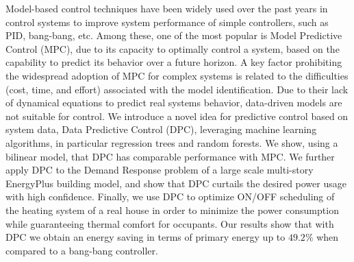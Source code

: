 Model-based control techniques have been widely used over the past years in control systems to improve system performance of simple controllers, such as PID, bang-bang, etc. Among these, one of the most popular is Model Predictive Control (MPC), due to its capacity to optimally control a system, based on the capability to predict its behavior over a future horizon. A key factor prohibiting the widespread adoption of MPC for complex systems is related to the difficulties (cost, time, and effort) associated with the model identification. Due to their lack of dynamical equations to predict real systems behavior, data-driven models are not suitable for control. We introduce a novel idea for predictive control based on system data, Data Predictive Control (DPC), leveraging machine learning algorithms, in particular regression trees and random forests. We show, using a bilinear model, that DPC has comparable performance with MPC. We further apply DPC to the Demand Response problem of a large scale multi-story EnergyPlus building model, and show that DPC curtails the desired power usage with high confidence. Finally, we use DPC to optimize ON/OFF scheduling of the heating system of a real house in order to minimize the power consumption while guaranteeing thermal comfort for occupants. Our results show that with DPC we obtain an energy saving in terms of primary energy up to $49.2\%$ when compared to a bang-bang controller.